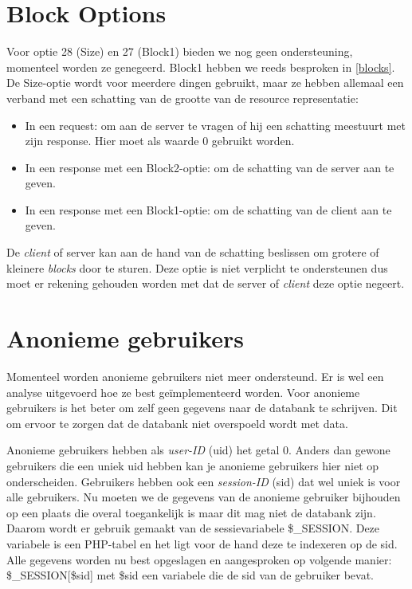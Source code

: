 \section{Block Options} \label{unsupportedBlockOptions}
Voor optie 28 (Size) en 27 (Block1) bieden we nog geen ondersteuning, momenteel worden ze genegeerd. Block1 hebben we reeds besproken in \ref{blocks}. De Size-optie wordt voor meerdere dingen gebruikt, maar ze hebben allemaal een verband met een schatting van de grootte van de resource representatie:
\begin{itemize}
\item In een request: om aan de server te vragen of hij een schatting meestuurt met zijn response. Hier moet als waarde 0 gebruikt worden.
\item In een response met een Block2-optie: om de schatting van de server aan te geven.
\item In een response met een Block1-optie: om de schatting van de client aan te geven.
\end{itemize}
De \textit{client} of server kan aan de hand van de schatting beslissen om grotere of kleinere \textit{blocks} door te sturen. Deze optie is niet verplicht te ondersteunen dus moet er rekening gehouden worden met dat de server of \textit{client} deze optie negeert.

\section{Anonieme gebruikers}
Momenteel worden anonieme gebruikers niet meer ondersteund. Er is wel een analyse uitgevoerd hoe ze best ge\"{i}mplementeerd worden. Voor anonieme gebruikers is het beter om zelf geen gegevens naar de databank te schrijven. Dit om ervoor te zorgen dat de databank niet overspoeld wordt met data.

Anonieme gebruikers hebben als \textit{user-ID} (uid) het getal 0. Anders dan gewone gebruikers die een uniek uid hebben kan je anonieme gebruikers hier niet op onderscheiden. Gebruikers hebben ook een \textit{session-ID} (sid) dat wel uniek is voor alle gebruikers. Nu moeten we de gegevens van de anonieme gebruiker bijhouden op een plaats die overal toegankelijk is maar dit mag niet de databank zijn. Daarom wordt er gebruik gemaakt van de sessievariabele \cite{sessionVariable} \$\_SESSION. Deze variabele is een PHP-tabel en het ligt voor de hand deze te indexeren op de sid. Alle gegevens worden nu best opgeslagen en aangesproken op volgende manier: \$\_SESSION[\$sid] met \$sid een variabele die de sid van de gebruiker bevat. 